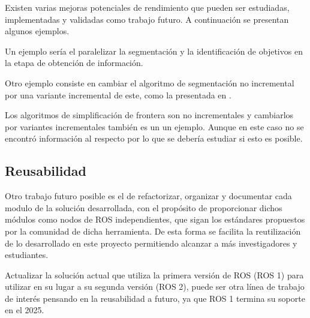 
Existen varias mejoras potenciales de rendimiento que pueden ser estudiadas,
implementadas y validadas como trabajo futuro. A continuación se presentan
algunos ejemplos.

Un ejemplo sería el paralelizar la segmentación y la identificación de
objetivos en la etapa de obtención de información.

Otro ejemplo consiste en cambiar el algoritmo de segmentación no incremental por una variante
incremental de este, como la presentada en \cite{Liu2015}. 

Los algoritmos de simplificación de frontera son no incrementales y cambiarlos
por variantes incrementales también es un un ejemplo. Aunque en este caso no se
encontró información al respecto por lo que se debería estudiar si esto es
posible.



\subsection{Reusabilidad}

Otro trabajo futuro posible es el de refactorizar, organizar y documentar cada
modulo de la solución desarrollada, con el propósito de proporcionar dichos
módulos como nodos de \gls{ROS} independientes, que sigan los estándares propuestos
por la comunidad de dicha herramienta. De esta forma se facilita la
reutilización de lo desarrollado en este proyecto permitiendo
alcanzar a más investigadores y estudiantes.

Actualizar la solución actual que utiliza la primera versión de \gls{ROS} (\gls{ROS} 1)
para utilizar en su lugar a su segunda versión (\gls{ROS} 2), puede ser otra línea de
trabajo de interés pensando en la reusabilidad a futuro, ya que \gls{ROS} 1 termina
su soporte en el 2025.




